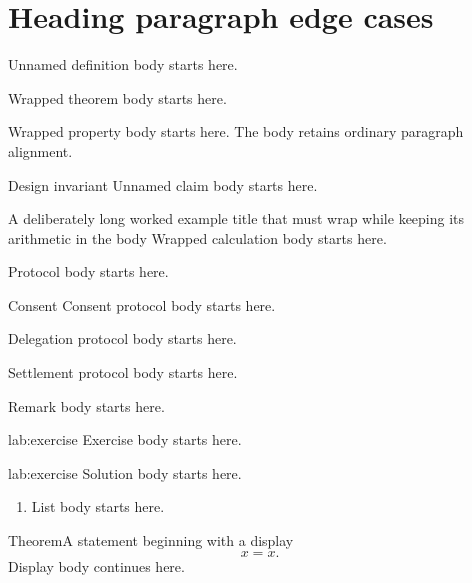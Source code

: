 \documentclass[11pt,twoside]{article}
\begin{document}
\section{Heading paragraph edge cases}
\begin{definition}\label{lab:unnamed}
Unnamed definition body starts here.
\end{definition}
\begin{theorem}\label{lab:wrapped}
Wrapped theorem body starts here.
\end{theorem}
\begin{property}
\ifdim\gluestretch\rightskip>0pt
  \PackageError{block-fixture}{Ragged heading leaked into property body}{}%
\fi
Wrapped property body starts here. The body retains ordinary paragraph alignment.
\end{property}
\begin{pdclaim}{Design invariant}{}\label{lab:unnamed-claim}
Unnamed claim body starts here.
\end{pdclaim}
\begin{pdexample}{A deliberately long worked example title that must wrap
while keeping its arithmetic in the body}\label{lab:wrapped-example}
Wrapped calculation body starts here.
\end{pdexample}
\begin{protocol}[Admission]
Protocol body starts here.
\end{protocol}
\begin{lsprotocol}{Consent}
Consent protocol body starts here.
\end{lsprotocol}
\begin{stpprotocol}[Delegation]
Delegation protocol body starts here.
\end{stpprotocol}
\begin{heprotocol}[Settlement]
Settlement protocol body starts here.
\end{heprotocol}
\begin{remark}[Scope]
Remark body starts here.
\end{remark}
\begin{pdexercise}{lab:exercise}
Exercise body starts here.
\end{pdexercise}
\begin{pdSolution}{lab:exercise}
Solution body starts here.
\end{pdSolution}
\begin{theorem}
\begin{enumerate}\item List body starts here.\end{enumerate}
\end{theorem}
\begin{pdclaim}{Theorem}{A statement beginning with a display}
\[ x=x. \]
Display body continues here.
\end{pdclaim}
\end{document}
